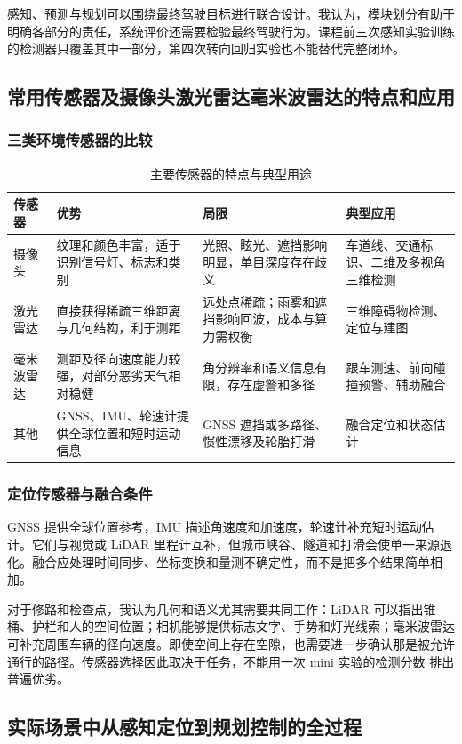 \documentclass[UTF8,zihao=-4,fontset=windows]{ctexart}
\begin{document}
感知、预测与规划可以围绕最终驾驶目标进行联合设计。我认为，模块划分有助于明确各部分的责任，系统评价还需要检验最终驾驶行为。课程前三次感知实验训练的检测器只覆盖其中一部分，第四次转向回归实验也不能替代完整闭环。

\FloatBarrier
\subsection{常用传感器及摄像头激光雷达毫米波雷达的特点和应用}
\subsubsection{三类环境传感器的比较}
\begin{table}[H]\centering\small\caption{主要传感器的特点与典型用途}
\begin{tabularx}{\textwidth}{lXXX}\toprule
传感器 & 优势 & 局限 & 典型应用\\\midrule
摄像头 & 纹理和颜色丰富，适于识别信号灯、标志和类别 & 光照、眩光、遮挡影响明显，单目深度存在歧义 & 车道线、交通标识、二维及多视角三维检测\\
激光雷达 & 直接获得稀疏三维距离与几何结构，利于测距 & 远处点稀疏；雨雾和遮挡影响回波，成本与算力需权衡 & 三维障碍物检测、定位与建图\\
毫米波雷达 & 测距及径向速度能力较强，对部分恶劣天气相对稳健 & 角分辨率和语义信息有限，存在虚警和多径 & 跟车测速、前向碰撞预警、辅助融合\\
其他 & GNSS、IMU、轮速计提供全球位置和短时运动信息 & GNSS 遮挡或多路径、惯性漂移及轮胎打滑 & 融合定位和状态估计\\\bottomrule\end{tabularx}\end{table}
\subsubsection{定位传感器与融合条件}
GNSS 提供全球位置参考，IMU 描述角速度和加速度，轮速计补充短时运动估计。它们与视觉或 LiDAR 里程计互补，但城市峡谷、隧道和打滑会使单一来源退化。融合应处理时间同步、坐标变换和量测不确定性，而不是把多个结果简单相加。

对于修路和检查点，我认为几何和语义尤其需要共同工作：LiDAR 可以指出锥桶、护栏和人的空间位置；相机能够提供标志文字、手势和灯光线索；毫米波雷达可补充周围车辆的径向速度。即使空间上存在空隙，也需要进一步确认那是被允许通行的路径。传感器选择因此取决于任务，不能用一次 mini 实验的检测分数 排出普遍优劣。

\FloatBarrier
\subsection{实际场景中从感知定位到规划控制的全过程}
\end{document}
